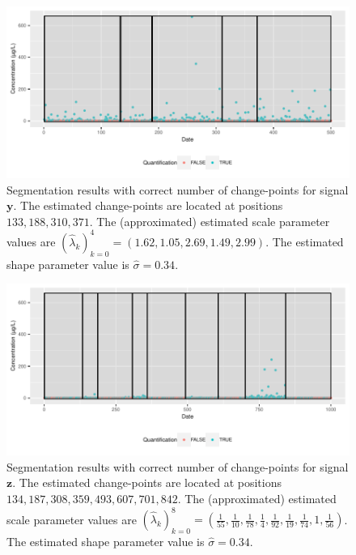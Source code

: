 \begin{figure}[htbp]
    \centering
    \includegraphics{figs/Chap4/y_sim_detect.pdf}
    \caption{Segmentation results with correct number of change-points for signal $\bm y$. The estimated change-points are located at positions $133,188,310,371$. The (approximated) estimated scale parameter values are $(\widehat{\lambda}_k)_{k=0}^4 = (1.62,1.05,2.69,1.49,2.99)$. The estimated shape parameter value is $\widehat{\sigma} = 0.34$.}
    \label{fig:detect_sim_y}
\end{figure}

\begin{figure}[htbp]
    \centering
    \includegraphics{figs/Chap4/y_sim2_detect.pdf}
    \caption{Segmentation results with correct number of change-points for signal $\bm z$. The estimated change-points are located at positions $134,187,308,359,493,607,701,842$. The (approximated) estimated scale parameter values are $(\widehat{\lambda}_k)_{k=0}^8 = (\frac{1}{55},\frac{1}{10},\frac{1}{78},\frac{1}{4},\frac{1}{92},\frac{1}{19},\frac{1}{74},1,\frac{1}{56})$. The estimated shape parameter value is $\widehat{\sigma} = 0.34$.}
    \label{fig:detect_sim_z}
\end{figure}


\clearpage

